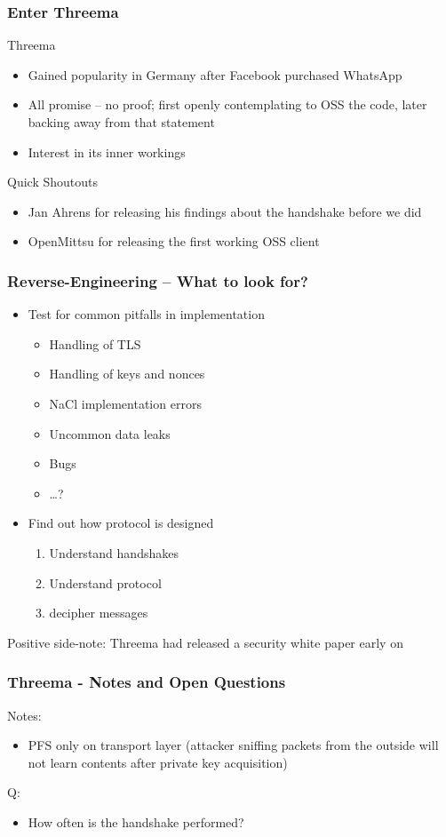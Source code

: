 \documentclass[
	aspectratio=169,
	xetex,
]{beamer}
\begin{document}
\begin{frame}
	\frametitle{Enter Threema}
	Threema
	\begin{itemize}
		\item Gained popularity in Germany after Facebook purchased WhatsApp
		\item All promise -- no proof; first openly contemplating to OSS the code, later backing away from that statement
		\item Interest in its inner workings
	\end{itemize}

	Quick Shoutouts
	\begin{itemize}
		\item Jan Ahrens for releasing his findings about the handshake before we did
		\item OpenMittsu for releasing the first working OSS client
	\end{itemize}
	
\end{frame}

\begin{frame}
	\frametitle{Reverse-Engineering -- What to look for?}
\begin{itemize}
	\item Test for common pitfalls in implementation
		\begin{itemize}
			\item Handling of TLS
			\item Handling of keys and nonces
			\item NaCl implementation errors
			\item Uncommon data leaks
			\item Bugs
			\item \ldots?
		\end{itemize}
	\item Find out how protocol is designed
		\begin{enumerate}
			\item Understand handshakes
			\item Understand protocol
			\item decipher messages
		\end{enumerate}
\end{itemize}
\alert{Positive side-note}: Threema had released a security white paper early on
\end{frame}

\begin{frame}
	\frametitle{Threema - Notes and Open Questions}
	Notes:
	\begin{itemize}
		\item PFS only on transport layer (attacker sniffing packets from the outside will not learn contents after private key acquisition)
	\end{itemize}
	Q:
	\begin{itemize}
		\item How often is the handshake performed?
	\end{itemize}
\end{frame}
\end{document}
